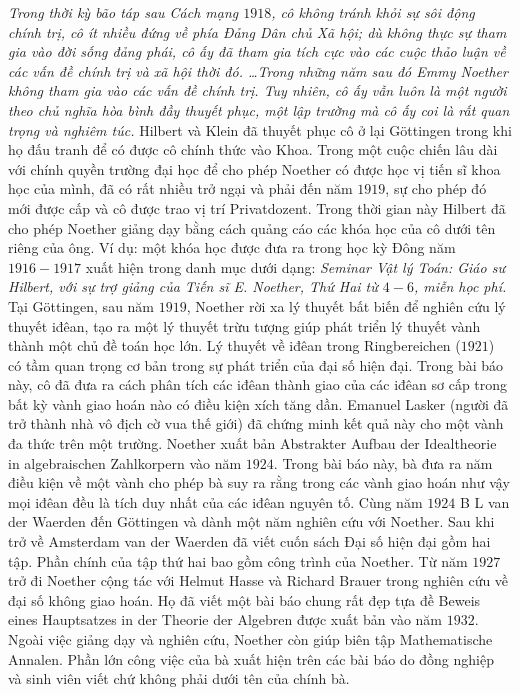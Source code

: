 \begin{multicols}{2}
	\vskip 0.05cm
	\textit{Trong thời kỳ bão táp sau Cách mạng $1918$, cô không tránh khỏi sự sôi động chính trị, cô ít nhiều đứng về phía Đảng Dân chủ Xã hội; dù không thực sự tham gia vào đời sống đảng phái, cô ấy đã tham gia tích cực vào các cuộc thảo luận về các vấn đề chính trị và xã hội thời đó. \ldots Trong những năm sau đó Emmy Noether không tham gia vào các vấn đề chính trị. Tuy nhiên, cô ấy vẫn luôn là một người theo chủ nghĩa hòa bình đầy thuyết phục, một lập trường mà cô ấy coi là rất quan trọng và nghiêm túc.}
	\vskip 0.05cm
	Hilbert và Klein đã thuyết phục cô ở lại Göttingen trong khi họ đấu tranh để có được cô chính thức vào Khoa. Trong một cuộc chiến lâu dài với chính quyền trường đại học để cho phép Noether có được học vị tiến sĩ khoa học của mình, đã có rất nhiều trở ngại và phải đến năm $1919$, sự cho phép đó mới được cấp và cô được trao vị trí Privatdozent. Trong thời gian này Hilbert đã cho phép Noether giảng dạy bằng cách quảng cáo các khóa học của cô dưới tên riêng của ông. Ví dụ: một khóa học được đưa ra trong học kỳ Đông năm $1916-1917$ xuất hiện trong danh mục dưới dạng:
	\vskip 0.05cm
	\textit{Seminar Vật lý Toán: Giáo sư Hilbert, với sự trợ giảng của Tiến sĩ E. Noether, Thứ Hai từ $4-6$, miễn học phí.}
	\vskip 0.05cm
	Tại Göttingen, sau năm $1919$, Noether rời xa lý thuyết bất biến để nghiên cứu lý thuyết iđêan, tạo ra một lý thuyết trừu tượng giúp phát triển lý thuyết vành thành một chủ đề toán học lớn. Lý thuyết về iđêan trong Ringbereichen ($1921$) có tầm quan trọng cơ bản trong sự phát triển của đại số hiện đại. Trong bài báo này, cô đã đưa ra cách phân tích các iđêan thành giao của các iđêan sơ cấp trong bất kỳ vành giao hoán nào có điều kiện xích tăng dần. Emanuel Lasker (người đã trở thành nhà vô địch cờ vua thế giới) đã chứng minh kết quả này cho một vành đa thức trên một trường. Noether xuất bản Abstrakter Aufbau der Idealtheorie in algebraischen Zahlkorpern vào năm $1924$. Trong bài báo này, bà đưa ra năm điều kiện về một vành cho phép bà suy ra rằng trong các vành giao hoán như vậy mọi iđêan đều là tích duy nhất của các iđêan nguyên tố.
	\vskip 0.05cm
	Cùng năm $1924$ B L van der Waerden đến Göttingen và dành một năm nghiên cứu với Noether. Sau khi trở về Amsterdam van der Waerden đã viết cuốn sách Đại số hiện đại gồm hai tập. Phần chính của tập thứ hai bao gồm công trình của Noether. Từ năm $1927$ trở đi Noether cộng tác với Helmut Hasse và Richard Brauer trong nghiên cứu về đại số không giao hoán. Họ đã viết một bài báo chung rất đẹp tựa đề Beweis eines Hauptsatzes in der Theorie der Algebren được xuất bản vào năm $1932$. Ngoài việc giảng dạy và nghiên cứu, Noether còn giúp biên tập Mathematische Annalen. Phần lớn công việc của bà xuất hiện trên các bài báo do đồng nghiệp và sinh viên viết chứ không phải dưới tên của chính bà.

\end{multicols}
